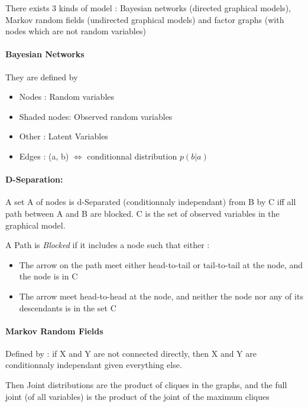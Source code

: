 		There exists 3 kinds of model : Bayesian networks (directed graphical models), Markov random fields (undirected graphical models) and factor graphs (with nodes which are not random variables)

			\paragraph*{Bayesian Networks}


			They are defined by 
			\begin{itemize}
				\item Nodes : Random variables
				\item Shaded nodes: Observed random variables
				\item Other : Latent Variables
				\item Edges : (a, b) $\iff$ conditionnal distribution $p(b|a)$
			\end{itemize}


			\paragraph*{D-Separation:} A set A of nodes is d-Separated (conditionnaly independant) from B by C iff all path between A and B are blocked. C is the set of observed variables in the graphical model.
			\begin{definition}
				A Path is \emph{Blocked} if it includes a node such that either :
				\begin{itemize}
					\item The arrow on the path meet either head-to-tail or tail-to-tail at the node, and the node is in C 
					\item The arrow meet head-to-head at the node, and neither the node nor any of its descendants is in the set C
				\end{itemize}
			\end{definition}

			\paragraph*{Markov Random Fields}
				Defined by : if X and Y are not connected directly, then X and Y are conditionnaly independant given everything else.

				Then Joint distributions are the product of cliques in the graphs, and the full joint (of all variables) is the product of the joint of the maximum cliques

